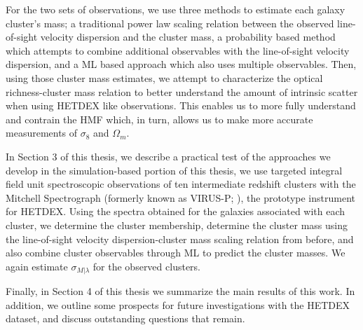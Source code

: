 For the two sets of observations, we use three methods to estimate each galaxy cluster's mass; a traditional power law scaling relation between the observed line-of-sight velocity dispersion and the cluster mass, a probability based method which attempts to combine additional observables with the line-of-sight velocity dispersion, and a ML based approach which also uses multiple observables. Then, using those cluster mass estimates, we attempt to characterize the optical richness-cluster mass relation to better understand the amount of intrinsic scatter when using HETDEX like observations. This enables us to more fully understand and contrain the HMF which, in turn, allows us to make more accurate measurements of $\sigma_8$ and $\Omega_m$.

In Section 3 of this thesis, we describe a practical test of the approaches we develop in the simulation-based portion of this thesis, we use targeted integral field unit spectroscopic observations of ten intermediate redshift clusters with the Mitchell Spectrograph (formerly known as VIRUS-P; \citealt{Hill2008a}), the prototype instrument for HETDEX. Using the spectra obtained for the galaxies associated with each cluster, we determine the cluster membership, determine the cluster mass using the line-of-sight velocity dispersion-cluster mass scaling relation from before, and also combine cluster observables through ML to predict the cluster masses. We again estimate $\sigma_{M|\lambda}$ for the observed clusters.

Finally, in Section 4 of this thesis we summarize the main results of this work. In addition, we outline some prospects for future investigations with the HETDEX dataset, and discuss outstanding questions that remain. 
